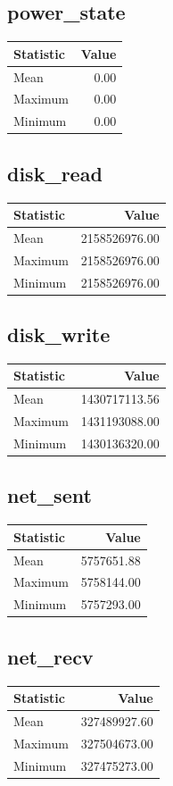 \documentclass[11pt]{article}
\begin{document}
\subsection{power_state}
\begin{tabular}{lr}
\toprule
Statistic & Value \\
\midrule
Mean & 0.00 \\
Maximum & 0.00 \\
Minimum & 0.00 \\
\bottomrule
\end{tabular}


\subsection{disk_read}
\begin{tabular}{lr}
\toprule
Statistic & Value \\
\midrule
Mean & 2158526976.00 \\
Maximum & 2158526976.00 \\
Minimum & 2158526976.00 \\
\bottomrule
\end{tabular}


\subsection{disk_write}
\begin{tabular}{lr}
\toprule
Statistic & Value \\
\midrule
Mean & 1430717113.56 \\
Maximum & 1431193088.00 \\
Minimum & 1430136320.00 \\
\bottomrule
\end{tabular}


\subsection{net_sent}
\begin{tabular}{lr}
\toprule
Statistic & Value \\
\midrule
Mean & 5757651.88 \\
Maximum & 5758144.00 \\
Minimum & 5757293.00 \\
\bottomrule
\end{tabular}


\subsection{net_recv}
\begin{tabular}{lr}
\toprule
Statistic & Value \\
\midrule
Mean & 327489927.60 \\
Maximum & 327504673.00 \\
Minimum & 327475273.00 \\
\bottomrule
\end{tabular}
\end{document}
